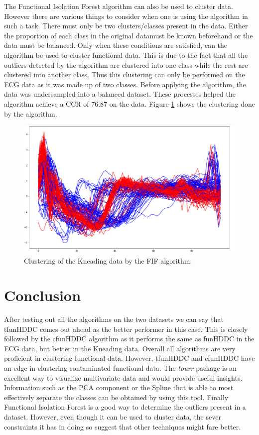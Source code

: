 \documentclass[]{article}
\begin{document}
The Functional Isolation Forest algorithm can also be used to cluster data. However there are various things to consider when one is using the algorithm in such a task. There must only be two clusters/classes present in the data. Either the proportion of each class in the original datamust be known beforehand or the data must be balanced. Only when these conditions are satisfied, can the algorithm be used to cluster functional data. This is due to the fact that all the outliers detected by the algorithm are clustered into one class while the rest are clustered into another class. Thus this clustering can only be performed on the ECG data as it was made up of two classes. Before applying the algorithm, the data was undersampled into a balanced dataset. These processes helped the algorithm achieve a CCR of 76.87 on the data. Figure \ref{fig:fif_cluster} shows the clustering done by the algorithm.

\begin{figure}
	\centering
	\includegraphics[scale=0.35]{fif_cluster.png}
	\caption{Clustering of the Kneading data by the FIF algorithm.}
	\label{fig:fif_cluster}
\end{figure}



\section{Conclusion}

After testing out all the algorithms on the two datasets we can say that tfunHDDC comes out ahead as the better performer in this case. This is closely followed by the cfunHDDC algorithm as it performs the same as funHDDC in the ECG data, but better in the Kneading data. Overall all algorithms are very proficient in clustering functional data. However, tfunHDDC and cfunHDDC have an edge in clustering contaminated functional data. The \emph{tourr} package is an excellent way to visualize multivariate data and would provide useful insights. Information such as the PCA component or the Spline that is able to most effectively separate the classes can be obtained by using this tool. Finally Functional Isolation Forest is a good way to determine the outliers present in a dataset. However, even though it can be used to cluster data, the sever constraints it has in doing so suggest that other techniques might fare better.
\end{document}

